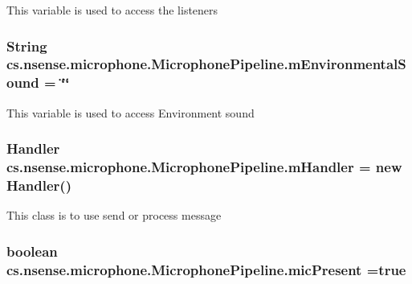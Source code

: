 This variable is used to access the listeners \hypertarget{classcs_1_1nsense_1_1microphone_1_1_microphone_pipeline_a95dbdadaa744d09652abf51d9347af9d}{
\subsubsection[{m\-Environmental\-Sound}]{\setlength{\rightskip}{0pt plus 5cm}String cs.\-nsense.\-microphone.\-Microphone\-Pipeline.\-m\-Environmental\-Sound = \char`\"{}\char`\"{}\hspace{0.3cm}{\ttfamily [static]}}}\label{classcs_1_1nsense_1_1microphone_1_1_microphone_pipeline_a95dbdadaa744d09652abf51d9347af9d}
This variable is used to access Environment sound \hypertarget{classcs_1_1nsense_1_1microphone_1_1_microphone_pipeline_a6485be60175a2b783a508711d6e5414a}{
\subsubsection[{m\-Handler}]{\setlength{\rightskip}{0pt plus 5cm}Handler cs.\-nsense.\-microphone.\-Microphone\-Pipeline.\-m\-Handler = new Handler()\hspace{0.3cm}{\ttfamily [private]}}}\label{classcs_1_1nsense_1_1microphone_1_1_microphone_pipeline_a6485be60175a2b783a508711d6e5414a}
This class is to use send or process message \hypertarget{classcs_1_1nsense_1_1microphone_1_1_microphone_pipeline_ae65a18cc5a3690fa0eba3b32409610b1}{
\subsubsection[{mic\-Present}]{\setlength{\rightskip}{0pt plus 5cm}boolean cs.\-nsense.\-microphone.\-Microphone\-Pipeline.\-mic\-Present =true\hspace{0.3cm}{\ttfamily [private]}}}\label{classcs_1_1nsense_1_1microphone_1_1_microphone_pipeline_ae65a18cc5a3690fa0eba3b32409610b1}
